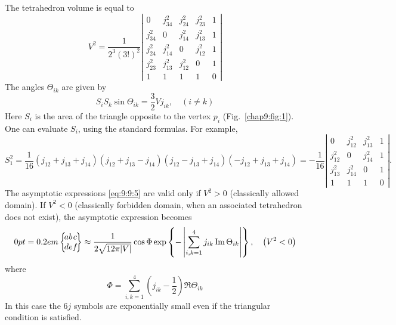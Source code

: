 The tetrahedron volume is equal to
\begin{equation}
V^{2}=\frac{1}{2^{3}(3!)^{2}}\left|\begin{array}{ccccc}
0 & j_{34}^{2} & j_{24}^{2} & j_{23}^{2} & 1  \label{eq:9:9:7}\\
j_{34}^{2} & 0 & j_{14}^{2} & j_{13}^{2} & 1 \\
j_{24}^{2} & j_{14}^{2} & 0 & j_{12}^{2} & 1 \\
j_{23}^{2} & j_{13}^{2} & j_{12}^{2} & 0 & 1 \\
1 & 1 & 1 & 1 & 0
\end{array}\right|
\end{equation}
The angles $\Theta_{i k}$ are given by
\begin{equation}
S_{i} S_{k} \sin \Theta_{i k}=\frac{3}{2} V j_{i k}, \quad(i \neq k) \label{eq:9:9:8}
\end{equation}
Here $S_{i}$ is the area of the triangle opposite to the vertex $p_{i}$ (Fig.~\ref{chap9:fig:1}). One can evaluate $S_{i}$, using the standard formulas. For example,
\begin{equation}
S_{1}^{2}=\frac{1}{16}\left(j_{12}+j_{13}+j_{14}\right)\left(j_{12}+j_{13}-j_{14}\right)\left(j_{12}-j_{13}+j_{14}\right)\left(-j_{12}+j_{13}+j_{14}\right)=-\frac{1}{16}\left|\begin{array}{cccc}
0 & j_{12}^{2} & j_{13}^{2} & 1  \label{eq:9:9:9}\\
j_{12}^{2} & 0 & j_{14}^{2} & 1 \\
j_{13}^{2} & j_{14}^{2} & 0 & 1 \\
1 & 1 & 1 & 0
\end{array}\right| .
\end{equation}
The asymptotic expressions \eqref{eq:9:9:5} are valid only if $V^{2}>0$ (classically allowed domain). If $V^{2}<0$ (classically forbidden domain, when an associated tetrahedron does not exist), the asymptotic expression becomes
\begin{equation}
\sixj{a}{b}{c}{d}{e}{f}  \label{eq:9:9:10} \approx \frac{1}{2 \sqrt{12 \pi|V|}} \cos \Phi \exp \left\{-\left|\sum_{i, k=1}^{4} j_{i k} \Im   \Theta_{i k}\right|\right\}, \quad\left(V^{2}<0\right)
\end{equation}
where
\begin{equation}
\Phi=\sum_{i, k=1}^{4}\left(j_{i k}-\frac{1}{2}\right) \Re   \Theta_{i k} \label{eq:9:9:11}
\end{equation}
In this case the $6 j$ symbols are exponentially small even if the triangular condition is satisfied.\\
